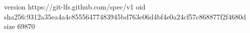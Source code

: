 version https://git-lfs.github.com/spec/v1
oid sha256:9312a35ea4a4c85556477483945bd763e06d4bf4e0a24cf57c868877f2f4680d
size 69870
